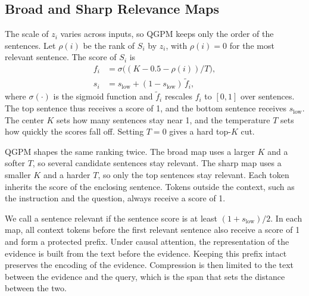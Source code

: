 \documentclass[11pt]{article}
\begin{document}
\subsection{Broad and Sharp Relevance Maps}
\label{sec:method-maps}

The scale of $z_i$ varies across inputs, so QGPM keeps only the order of the sentences. Let $\rho(i)$ be the rank of $S_i$ by $z_i$, with $\rho(i) = 0$ for the most relevant sentence. The score of $S_i$ is
\begin{equation}
\begin{aligned}
f_i &= \sigma\big((K - 0.5 - \rho(i)) / T\big), \\
s_i &= s_{\mathrm{low}} + (1 - s_{\mathrm{low}})\, \tilde f_i,
\end{aligned}
\label{eq:rank-scoring}
\end{equation}
where $\sigma(\cdot)$ is the sigmoid function and $\tilde f_i$ rescales $f_i$ to $[0, 1]$ over sentences. The top sentence thus receives a score of 1, and the bottom sentence receives $s_{\mathrm{low}}$. The center $K$ sets how many sentences stay near 1, and the temperature $T$ sets how quickly the scores fall off. Setting $T = 0$ gives a hard top-$K$ cut.

QGPM shapes the same ranking twice. The broad map uses a larger $K$ and a softer $T$, so several candidate sentences stay relevant. The sharp map uses a smaller $K$ and a harder $T$, so only the top sentences stay relevant. Each token inherits the score of the enclosing sentence. Tokens outside the context, such as the instruction and the question, always receive a score of 1.

We call a sentence relevant if the sentence score is at least $(1 + s_{\mathrm{low}})/2$. In each map, all context tokens before the first relevant sentence also receive a score of 1 and form a protected prefix. Under causal attention, the representation of the evidence is built from the text before the evidence. Keeping this prefix intact preserves the encoding of the evidence. Compression is then limited to the text between the evidence and the query, which is the span that sets the distance between the two.
\end{document}

